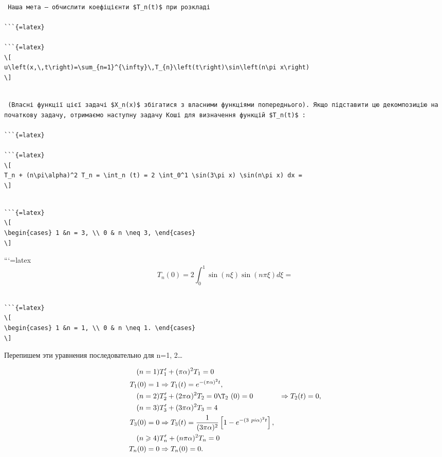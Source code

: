 \documentclass[
  ukrainian,
]{article}
\begin{document}
\begin{verbatim}

 Наша мета — обчислити коефіцієнти $T_n(t)$ при розкладі

```{=latex}

```{=latex}
\[
u\left(x,\,t\right)=\sum_{n=1}^{\infty}\,T_{n}\left(t\right)\sin\left(n\pi x\right)
\]
\end{verbatim}

\begin{verbatim}

 (Власні функції цієї задачі $X_n(x)$ збігатися з власними функціями попереднього). Якщо підставити цю декомпозицію на початкову задачу, отримаємо наступну задачу Коші для визначення функцій $T_n(t)$ :

```{=latex}

```{=latex}
\[
T_n + (n\pi\alpha)^2 T_n = \int_n (t) = 2 \int_0^1 \sin(3\pi x) \sin(n\pi x) dx =
\]
\end{verbatim}

\begin{verbatim}

```{=latex}
\[
\begin{cases} 1 &n = 3, \\ 0 & n \neq 3, \end{cases}
\]
\end{verbatim}

```{=latex}
\[
T_n(0) = 2 \int_0^1 \sin(n\xi) \sin(n\pi\xi) d\xi =
\]

\begin{verbatim}

```{=latex}
\[
\begin{cases} 1 &n = 1, \\ 0 & n \neq 1. \end{cases}
\]
\end{verbatim}

Перепишем эти уравнения последовательно для n=1, 2\ldots{}

\[
\begin{aligned} (n=1) & T_1' + (\pi\alpha)^2 T_1 = 0 \\ T_1(0) = 1 & \Rightarrow T_1(t) = e^{-(\pi\alpha)^2 t}, \\ (n=2) & T_2' + (2\pi\alpha)^2 T_2 = 0 \T_2\  (0) = 0 & \Rightarrow T_2(t) = 0, \\ (n=3) & T_3' + (3\pi\alpha)^2 T_3 = 4 \\ T_3(0) = 0 & \Rightarrow T_3(t) = \frac{1}{(3\pi\alpha)^2} \left[1 - e^{-(3\ pi\alpha)^2 t}\right], \\ (n \geqslant 4) & T_n' + (n\pi\alpha)^2 T_n = 0 \\ T_n(0) = 0 & \Rightarrow T_n(0) = 0. \end{aligned}
\]
\end{document}
